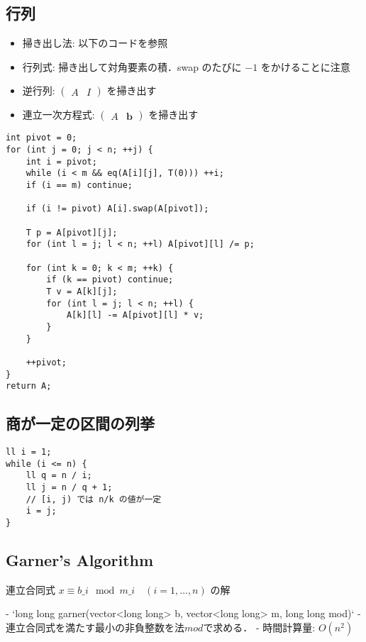 \subsection{行列}

\begin{small}
\begin{itemize}
    \item 掃き出し法: 以下のコードを参照
    \item 行列式: 掃き出して対角要素の積．swap のたびに $-1$ をかけることに注意
    \item 逆行列: $\begin{pmatrix}A & I\end{pmatrix}$ を掃き出す
    \item 連立一次方程式: $\begin{pmatrix}A & \boldsymbol{b}\end{pmatrix}$ を掃き出す
\end{itemize}
\end{small}

\begin{lstlisting}
int pivot = 0;
for (int j = 0; j < n; ++j) {
    int i = pivot;
    while (i < m && eq(A[i][j], T(0))) ++i;
    if (i == m) continue;

    if (i != pivot) A[i].swap(A[pivot]);

    T p = A[pivot][j];
    for (int l = j; l < n; ++l) A[pivot][l] /= p;

    for (int k = 0; k < m; ++k) {
        if (k == pivot) continue;
        T v = A[k][j];
        for (int l = j; l < n; ++l) {
            A[k][l] -= A[pivot][l] * v;
        }
    }

    ++pivot;
}
return A;
\end{lstlisting}

\subsection{商が一定の区間の列挙}

\begin{lstlisting}
ll i = 1;
while (i <= n) {
    ll q = n / i;
    ll j = n / q + 1;
    // [i, j) では n/k の値が一定
    i = j;
}
\end{lstlisting}

\subsection{Garner's Algorithm}

\begin{small}
\begin{markdown}
連立合同式 $x \equiv b\_i \mod m\_i \quad (i=1,\dots,n)$ の解

- `long long garner(vector<long long> b, vector<long long> m, long long mod)`
    - 連立合同式を満たす最小の非負整数を法$mod$で求める．
    - 時間計算量: $O(n^2)$

\end{markdown}
\end{small}

